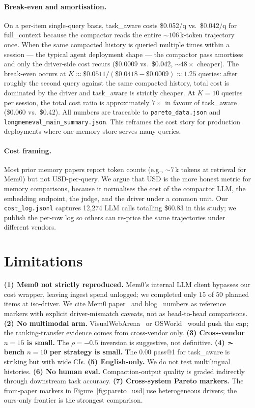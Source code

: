 \documentclass{article}
\begin{document}
\paragraph{Break-even and amortisation.}
On a per-item single-query basis, \textsf{task\_aware} costs
\$0.052/q vs.\ \$0.042/q for \textsf{full\_context} because the
compactor reads the entire $\sim\!106$\,k-token trajectory once. When
the same compacted history is queried multiple times within a session
--- the typical agent deployment shape --- the compactor pass
amortises and only the driver-side cost recurs (\$0.0009 vs.\
\$0.042, $\sim\!48\times$ cheaper). The break-even occurs at
$K \approx \$0.0511 / (\$0.0418 - \$0.0009) \approx 1.25$ queries:
after roughly the second query against the same compacted history,
total cost is dominated by the driver and \textsf{task\_aware} is
strictly cheaper. At $K{=}10$ queries per session, the total cost
ratio is approximately $7\times$ in favour of \textsf{task\_aware}
(\$0.060 vs.\ \$0.42). All numbers are traceable to
\texttt{pareto\_data.json} and \texttt{longmemeval\_main\_summary.json}.
This reframes the cost story for production deployments where one
memory store serves many queries.

\paragraph{Cost framing.}
Most prior memory papers report token counts (e.g., $\sim\!7$\,k
tokens at retrieval for Mem0) but not USD-per-query. We argue that USD
is the more honest metric for memory comparisons, because it normalises
the cost of the compactor LLM, the embedding endpoint, the judge, and
the driver under a common unit. Our \texttt{cost\_log.jsonl} captures
12{,}274 LLM calls totalling \$60.83 in this study; we publish the
per-row log so others can re-price the same trajectories under
different vendors.

\section{Limitations}\label{sec:limits}

\textbf{(1) Mem0 not strictly reproduced.} Mem0's internal LLM client
bypasses our cost wrapper, leaving ingest spend unlogged; we
completed only $15$ of $50$ planned items at iso-driver. We cite Mem0
paper~\citep{mem0_2025} and blog~\citep{mem0_blog_2025} numbers as
reference markers with explicit driver-mismatch caveats, not as
head-to-head comparisons.
\textbf{(2) No multimodal arm.} VisualWebArena~\citep{visualwebarena_2024}
or OSWorld~\citep{osworld_2024} would push the cap; the
ranking-transfer evidence comes from cross-vendor only.
\textbf{(3) Cross-vendor $n{=}15$ is small.} The $\rho{=}{-}0.5$
inversion is suggestive, not definitive.
\textbf{(4) $\tau$-bench $n{=}10$ per strategy is small.} The
$0.00$ pass@1 for \textsf{task\_aware} is striking but with wide CIs.
\textbf{(5) English-only.} We do not test multilingual histories.
\textbf{(6) No human eval.} Compaction-output quality is graded
indirectly through downstream task accuracy.
\textbf{(7) Cross-system Pareto markers.} The from-paper markers in
Figure~\ref{fig:pareto_usd} use heterogeneous drivers; the ours-only
frontier is the strongest comparison.
\end{document}
